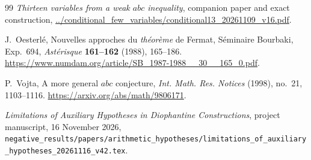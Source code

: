 \documentclass[11pt,a4paper]{article}
\begin{document}
\begin{thebibliography}{99}
\emph{Thirteen variables from a weak $abc$ inequality},
companion paper and exact construction,
\url{../conditional_few_variables/conditional13_20261109_v16.pdf}.

J.~Oesterl\'e,
Nouvelles approches du \emph{th\'eor\`eme} de Fermat,
S\'eminaire Bourbaki, Exp.~694,
\emph{Ast\'erisque} \textbf{161--162} (1988), 165--186.
\url{https://www.numdam.org/article/SB_1987-1988__30__165_0.pdf}.

P.~Vojta, A more general $abc$ conjecture,
\emph{Int. Math. Res. Notices} (1998), no.~21, 1103--1116.
\url{https://arxiv.org/abs/math/9806171}.

\emph{Limitations of Auxiliary Hypotheses in Diophantine Constructions},
project manuscript, 16 November 2026,
\nolinkurl{negative_results/papers/arithmetic_hypotheses/limitations_of_auxiliary_hypotheses_20261116_v42.tex}.
\end{thebibliography}
\end{document}
